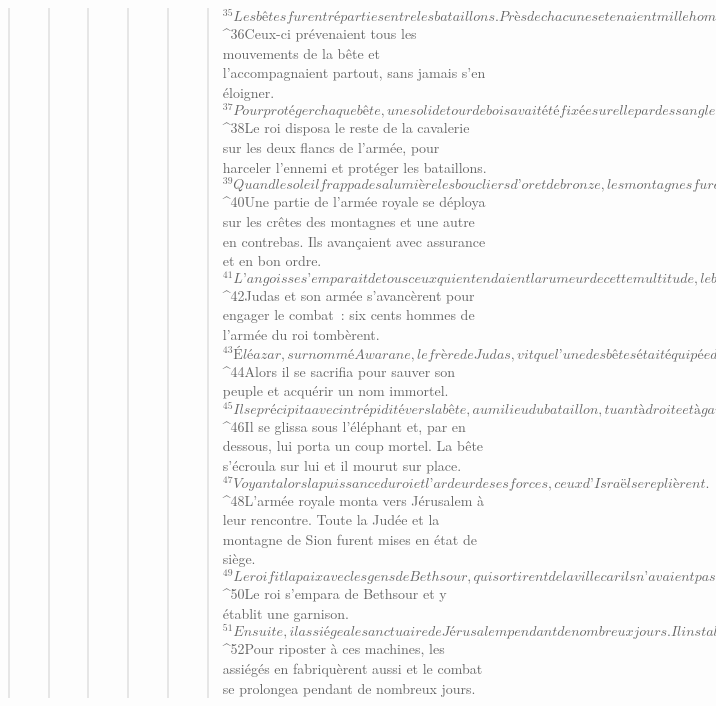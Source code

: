 \begin{verse}
\begin{verse}
\begin{verse}
\begin{verse}
\begin{verse}
\begin{verse}
${}^{35}Les bêtes furent réparties entre les bataillons. Près de chacune se tenaient mille hommes cuirassés de mailles et coiffés d’un casque de bronze, ainsi que cinq cents cavaliers d’élite. 
${}^{36}Ceux-ci prévenaient tous les mouvements de la bête et l’accompagnaient partout, sans jamais s’en éloigner. 
${}^{37}Pour protéger chaque bête, une solide tour de bois avait été fixée sur elle par des sangles. À l’intérieur se tenaient les trois guerriers qui combattaient sur la bête, en plus de son cornac. 
${}^{38}Le roi disposa le reste de la cavalerie sur les deux flancs de l’armée, pour harceler l’ennemi et protéger les bataillons. 
${}^{39}Quand le soleil frappa de sa lumière les boucliers d’or et de bronze, les montagnes furent illuminées par leur reflet et elles resplendirent comme des torches de feu. 
${}^{40}Une partie de l’armée royale se déploya sur les crêtes des montagnes et une autre en contrebas. Ils avançaient avec assurance et en bon ordre. 
${}^{41}L’angoisse s’emparait de tous ceux qui entendaient la rumeur de cette multitude, le bruit de sa marche et le cliquetis des armes entrechoquées, car cette armée était vraiment immense et très puissante. 
${}^{42}Judas et son armée s’avancèrent pour engager le combat : six cents hommes de l’armée du roi tombèrent. 
${}^{43}Éléazar, surnommé Awarane, le frère de Judas, vit que l’une des bêtes était équipée d’un harnais royal cuirassé et surpassait toutes les autres : il supposa que le roi était dessus. 
${}^{44}Alors il se sacrifia pour sauver son peuple et acquérir un nom immortel. 
${}^{45}Il se précipita avec intrépidité vers la bête, au milieu du bataillon, tuant à droite et à gauche, si bien qu’on s’écarta devant lui de part et d’autre. 
${}^{46}Il se glissa sous l’éléphant et, par en dessous, lui porta un coup mortel. La bête s’écroula sur lui et il mourut sur place. 
${}^{47}Voyant alors la puissance du roi et l’ardeur de ses forces, ceux d’Israël se replièrent.
${}^{48}L’armée royale monta vers Jérusalem à leur rencontre. Toute la Judée et la montagne de Sion furent mises en état de siège. 
${}^{49}Le roi fit la paix avec les gens de Bethsour, qui sortirent de la ville car ils n’avaient pas suffisamment de vivres pour y soutenir un siège. C’était en effet l’année du repos sabbatique. 
${}^{50}Le roi s’empara de Bethsour et y établit une garnison. 
${}^{51}Ensuite, il assiégea le sanctuaire de Jérusalem pendant de nombreux jours. Il installa des catapultes et des machines de guerre, lance-flammes, lance-pierres, lance-flèches et frondes. 
${}^{52}Pour riposter à ces machines, les assiégés en fabriquèrent aussi et le combat se prolongea pendant de nombreux jours. 

\end{verse}
\end{verse}
\end{verse}
\end{verse}
\end{verse}
\end{verse}
